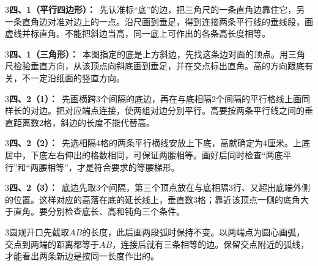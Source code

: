 \documentclass[multi=snippet,border={5bp 20bp 5bp 5bp}]{standalone}
\newenvironment{snippet}[3]{\begin{minipage}{#1bp}\color{answerred}\fontsize{#2}{#3}\selectfont\raggedright}{\end{minipage}}
\begin{document}
\begin{snippet}{505}{11.5}{14}\begin{multicols}{3}\raggedcolumns \textbf{四、1（平行四边形）：}\ 先认准标“底”的边，把三角尺的一条直角边靠住它，另一条直角边对准对边上的一点。沿尺画到垂足，得到连接两条平行线的垂线段，画虚线并标直角。不能把斜边当高，同一底上可作出的各条高长度相等。\end{multicols}\end{snippet}
\begin{snippet}{505}{11.5}{14}\begin{multicols}{3}\raggedcolumns \textbf{四、1（三角形）：}\ 本图指定的底是上方斜边，先找这条边对面的顶点。用三角尺检验垂直方向，从该顶点向斜底画到垂足，并在交点标出直角。高的方向跟底有关，不一定沿纸面的竖直方向。\end{multicols}\end{snippet}
\begin{snippet}{505}{11.5}{14}\begin{multicols}{3}\raggedcolumns \textbf{四、2（1）：}\ 先画横跨3个间隔的底边，再在与底相隔2个间隔的平行格线上画同样长的对边。把对应端点连接，使两组对边分别平行。高要按两条平行线之间的垂直距离数2格，斜边的长度不能代替高。\end{multicols}\end{snippet}
\begin{snippet}{505}{11.5}{14}\begin{multicols}{3}\raggedcolumns \textbf{四、2（2）：}\ 先选相隔4格的两条平行横线安放上下底，高就确定为4厘米。上底居中，下底左右伸出的格数相同，可保证两腰相等。画好后同时检查“两底平行”和“两腰相等”，才是符合要求的等腰梯形。\end{multicols}\end{snippet}
\begin{snippet}{505}{11.5}{14}\begin{multicols}{3}\raggedcolumns \textbf{四、2（3）：}\ 底边先取3个间隔，第三个顶点放在与底相隔3行、又超出底端外侧的位置。这样对应的高落在底的延长线上，垂直数3格；靠近该顶点一侧的底角大于直角。要分别检查底长、高和钝角三个条件。\end{multicols}\end{snippet}
\begin{snippet}{505}{11.5}{14}\begin{multicols}{3}\raggedcolumns 圆规开口先截取\(AB\)\allowbreak 的长度，此后画两段弧时保持不变。以两端点为圆心画弧，交点到两端的距离都等于\(AB\)\allowbreak ，连接后就有三条相等的边。保留交点附近的弧线，才能看出两条新边是按同一长度作出的。\end{multicols}\end{snippet}
\end{document}
